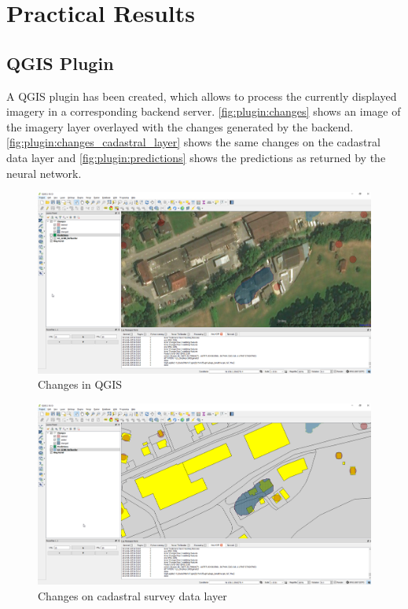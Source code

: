 
\chapter{Practical Results}\label{chp:practical_results}

\section{QGIS Plugin}
A QGIS plugin has been created, which allows to process the currently displayed imagery in a corresponding backend server. \autoref{fig:plugin:changes} shows an image of the imagery layer overlayed with the changes generated by the backend. \autoref{fig:plugin:changes_cadastral_layer} shows the same changes on the cadastral data layer and \autoref{fig:plugin:predictions} shows the predictions as returned by the neural network.

\begin{figure}[H]
    \centering
	\includegraphics[width=1\linewidth]{chapters/practical_results/images/qgis_changes_aerial.png}
	\caption{Changes in QGIS}
	\label{fig:plugin:changes}
\end{figure}

\begin{figure}[H]
    \centering
	\includegraphics[width=1\linewidth]{chapters/practical_results/images/qgis_changes.png}
	\caption{Changes on cadastral survey data layer}
	\label{fig:plugin:changes_cadastral_layer}
\end{figure}


